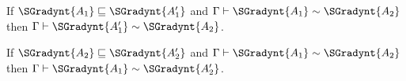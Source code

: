 \begin{lemma}
  \label{lemma:congruence_of_type_consistency_along_type_precision}
  \begin{enumR}
  \item[] 
  \item If $ \SGradynt{A_{{\mathrm{1}}}}  \sqsubseteq  \SGradynt{A'_{{\mathrm{1}}}} $ and $ \Gamma  \vdash  \SGradynt{A_{{\mathrm{1}}}}  \sim  \SGradynt{A_{{\mathrm{2}}}} $ then
    $ \Gamma  \vdash  \SGradynt{A'_{{\mathrm{1}}}}  \sim  \SGradynt{A_{{\mathrm{2}}}} $.
    
  \item If $ \SGradynt{A_{{\mathrm{2}}}}  \sqsubseteq  \SGradynt{A'_{{\mathrm{2}}}} $ and $ \Gamma  \vdash  \SGradynt{A_{{\mathrm{1}}}}  \sim  \SGradynt{A_{{\mathrm{2}}}} $ then
    $ \Gamma  \vdash  \SGradynt{A_{{\mathrm{1}}}}  \sim  \SGradynt{A'_{{\mathrm{2}}}} $.  
  \end{enumR}
\end{lemma}
